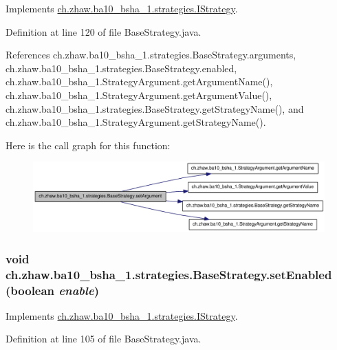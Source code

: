 Implements \hyperlink{interfacech_1_1zhaw_1_1ba10__bsha__1_1_1strategies_1_1IStrategy_aa5cbdd49578bcc84207fc073bc91da99}{ch.zhaw.ba10\_\-bsha\_\-1.strategies.IStrategy}.

Definition at line 120 of file BaseStrategy.java.

References ch.zhaw.ba10\_\-bsha\_\-1.strategies.BaseStrategy.arguments, ch.zhaw.ba10\_\-bsha\_\-1.strategies.BaseStrategy.enabled, ch.zhaw.ba10\_\-bsha\_\-1.StrategyArgument.getArgumentName(), ch.zhaw.ba10\_\-bsha\_\-1.StrategyArgument.getArgumentValue(), ch.zhaw.ba10\_\-bsha\_\-1.strategies.BaseStrategy.getStrategyName(), and ch.zhaw.ba10\_\-bsha\_\-1.StrategyArgument.getStrategyName().

Here is the call graph for this function:\nopagebreak
\begin{figure}[H]
\begin{center}
\leavevmode
\includegraphics[width=330pt]{classch_1_1zhaw_1_1ba10__bsha__1_1_1strategies_1_1BaseStrategy_ad1b20c8f3f41126c9e6cef52d3f30bbe_cgraph}
\end{center}
\end{figure}
\hypertarget{classch_1_1zhaw_1_1ba10__bsha__1_1_1strategies_1_1BaseStrategy_acfeb454c9eda3e3279c75ce8101d980c}{
\subsubsection[{setEnabled}]{\setlength{\rightskip}{0pt plus 5cm}void ch.zhaw.ba10\_\-bsha\_\-1.strategies.BaseStrategy.setEnabled (boolean {\em enable})}}
\label{classch_1_1zhaw_1_1ba10__bsha__1_1_1strategies_1_1BaseStrategy_acfeb454c9eda3e3279c75ce8101d980c}


Implements \hyperlink{interfacech_1_1zhaw_1_1ba10__bsha__1_1_1strategies_1_1IStrategy_ae95d5ca1a67248a3c6dd80b40d6f6a32}{ch.zhaw.ba10\_\-bsha\_\-1.strategies.IStrategy}.

Definition at line 105 of file BaseStrategy.java.

